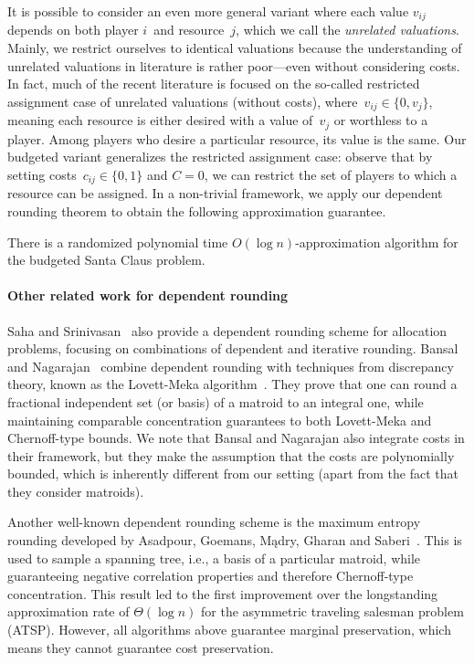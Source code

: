 It is possible to consider an even more general variant
where each value $v_{ij}$ depends on both player $i$~and
resource~$j$, which we call the \emph{unrelated valuations}.
Mainly, we restrict ourselves to identical valuations because
the understanding of unrelated valuations in literature is
rather poor---even without considering costs.
In fact, much of the recent literature is focused on the so-called
restricted assignment case
of unrelated valuations (without costs),
where~$v_{ij}\in\{0, v_j\}$,
meaning each resource is either desired with a value of~$v_j$ or worthless to a player.
Among players who desire a particular resource,
its value is the same. Our budgeted variant generalizes the
restricted assignment case: observe that by setting costs~$c_{ij}\in\{0,1\}$ and $C = 0$, we can restrict
the set of players to which a resource can be assigned.
In a non-trivial framework, we apply our dependent rounding theorem
to obtain the following approximation guarantee.
\begin{theorem}
    There is a randomized polynomial time $O(\log n)$-approximation algorithm for the budgeted Santa Claus problem.
\end{theorem}

\paragraph*{Other related work for dependent rounding}
Saha and Srinivasan~\cite{SahaS18} also provide a
dependent rounding scheme for allocation problems,
focusing on combinations of dependent
and iterative rounding.
Bansal and Nagarajan~\cite{BansalN16}
combine dependent rounding with techniques from discrepancy theory, known as the Lovett-Meka algorithm~\cite{LovettM15}. They
prove that one can round a fractional independent
set (or basis) of a matroid to an integral one,
while maintaining comparable concentration guarantees to both Lovett-Meka and Chernoff-type bounds.
We note that Bansal and Nagarajan also integrate
costs in their framework, but they make the
assumption that the costs are polynomially bounded,
which is inherently different from our setting (apart from the fact that they consider matroids).

Another well-known dependent rounding scheme is the maximum entropy
rounding developed by Asadpour, Goemans, M{\k{a}}dry, Gharan and Saberi~\cite{AsadpourGMGS17}.
This is used to sample
a spanning tree, i.e., a basis of a particular matroid,
while guaranteeing negative correlation properties and therefore Chernoff-type concentration.
This result led to the first improvement over the longstanding
approximation rate of $\Theta(\log n)$ for the asymmetric
traveling salesman problem (ATSP).
However, all algorithms above guarantee marginal preservation, which means they
cannot guarantee cost preservation.

